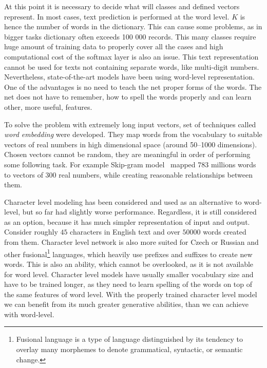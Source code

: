 At this point it is necessary to decide what will classes and defined vectors represent. In most cases, text prediction is performed at the word level. $ K $ is hence the number of words in the dictionary. This can cause some problems, as in bigger tasks dictionary often exceeds 100 000 records. This many classes require huge amount of training data to properly cover all the cases and high computational cost of the softmax layer is also an issue. This text representation cannot be used for texts not containing separate words, like multi-digit numbers. Nevertheless, state-of-the-art models have been using word-level representation. One of the advantages is no need to teach the net proper forms of the words. The net does not have to remember, how to spell the words properly and can learn other, more useful, features.

To solve the problem with extremely long input vectors, set of techniques called \emph{word embedding} were developed. They map words from the vocabulary to suitable vectors of real numbers in high dimensional space (around 50--1000 dimensions). Chosen vectors cannot be random, they are meaningful in order of performing some following task. For example Skip-gram model~\cite{DBLP:journals/corr/abs-1301-3781} mapped 783 millions words to vectors of 300 real numbers, while creating reasonable relationships between them.


Character level modeling has been considered and used as an alternative to word-level, but so far had slightly worse performance. Regardless, it is still considered as an option, because it has much simpler representation of input and output. Consider roughly $ 45 $ characters in English text and over $ 50 000 $ words created from them. Character level network is also more suited for Czech or Russian and other fusional\footnote{Fusional language is a type of language distinguished by its tendency to overlay many morphemes to denote grammatical, syntactic, or semantic change.} languages, which heavily use prefixes and suffixes to create new words. This is also an ability, which cannot be overlooked, as it is not available for word level.
Character level models have usually smaller vocabulary size and have to be trained longer, as they need to learn spelling of the words on top of the same features of word level. With the properly trained character level model we can benefit from its much greater generative abilities, than we can achieve with word-level.

